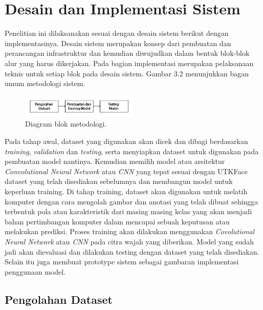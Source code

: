 \section{Desain dan Implementasi Sistem}
\label{sec:arsitektur}


Penelitian ini dilaksanakan sesuai dengan desain sistem berikut dengan implementasinya. Desain sistem merupakan konsep dari
pembuatan dan perancangan infrastruktur dan kemudian diwujudkan dalam bentuk blok-blok alur yang harus dikerjakan. Pada 
bagian implementasi merupakan pelaksanaan teknis untuk setiap blok pada desain sistem. Gambar 3.2 menunjukkan bagan umum 
metodologi sistem.
\begin{figure} [ht]
  \centering
  \includegraphics[width=0.5\textwidth]{gambar/metodologi.jpg}

  \caption{Diagram blok metodologi.}
  \label{fig:metodologi}
\end{figure}

Pada tahap awal, dataset yang digunakan akan dicek dan dibagi berdasarkan \textit{training}, \textit{validation} dan 
\textit{testing}, serta menyiapkan dataset untuk digunakan pada pembuatan model nantinya. Kemudian 
memilih model atau arsitektur \textit{Convolutional Neural Network} atau \textit{CNN} yang tepat sesuai dengan UTKFace 
dataset yang telah disediakan sebelumnya dan membangun model untuk keperluan training.
Di tahap training, dataset akan digunakan untuk melatih komputer dengan cara mengolah gambar dan anotasi 
yang telah dibuat sehingga terbentuk pola atau karakteristik dari masing masing kelas yang akan 
menjadi bahan pertimbangan komputer dalam mencapai sebuah keputusan atau melakukan prediksi. 
Proses training akan dilakukan menggunakan \textit{Covolutional Neural Network} atau \textit{CNN} pada citra wajah 
yang diberikan. Model yang sudah jadi akan dievaluasi dan dilakukan testing dengan dataset
yang telah disediakan. Selain itu juga membuat prototype sistem sebagai gambaran implementasi penggunaan model.

\subsection{Pengolahan Dataset}
\label{subsec:pengolahandataset}

